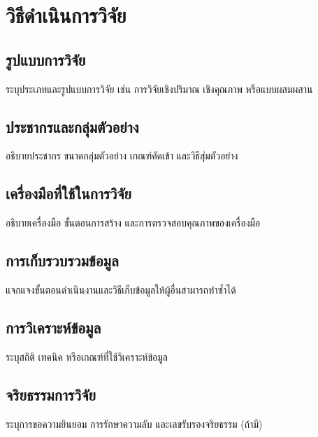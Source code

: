 \chapter{วิธีดำเนินการวิจัย}
\section{รูปแบบการวิจัย}
ระบุประเภทและรูปแบบการวิจัย เช่น การวิจัยเชิงปริมาณ เชิงคุณภาพ หรือแบบผสมผสาน
\section{ประชากรและกลุ่มตัวอย่าง}
อธิบายประชากร ขนาดกลุ่มตัวอย่าง เกณฑ์คัดเข้า และวิธีสุ่มตัวอย่าง
\section{เครื่องมือที่ใช้ในการวิจัย}
อธิบายเครื่องมือ ขั้นตอนการสร้าง และการตรวจสอบคุณภาพของเครื่องมือ
\section{การเก็บรวบรวมข้อมูล}
แจกแจงขั้นตอนดำเนินงานและวิธีเก็บข้อมูลให้ผู้อื่นสามารถทำซ้ำได้
\section{การวิเคราะห์ข้อมูล}
ระบุสถิติ เทคนิค หรือเกณฑ์ที่ใช้วิเคราะห์ข้อมูล
\section{จริยธรรมการวิจัย}
ระบุการขอความยินยอม การรักษาความลับ และเลขรับรองจริยธรรม (ถ้ามี)
